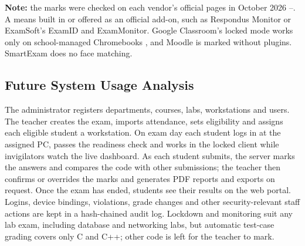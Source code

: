 \noindent\textbf{Note:} the marks were checked on each vendor's official pages in October 2026 \cite{respondus1}--\cite{gclassroom_quiz}. A \cmark{} means built in or offered as an official add-on, such as Respondus Monitor \cite{respondus_webcam} or ExamSoft's ExamID and ExamMonitor. Google Classroom's locked mode works only on school-managed Chromebooks \cite{gclassroom_quiz}, and Moodle is marked without plugins. SmartExam does no face matching.

\subsection{Future System Usage Analysis}

The administrator registers departments, courses, labs, workstations and users. The teacher creates the exam, imports attendance, sets eligibility and assigns each eligible student a workstation. On exam day each student logs in at the assigned PC, passes the readiness check and works in the locked client while invigilators watch the live dashboard. As each student submits, the server marks the answers and compares the code with other submissions; the teacher then confirms or overrides the marks and generates PDF reports and exports on request. Once the exam has ended, students see their results on the web portal. Logins, device bindings, violations, grade changes and other security-relevant staff actions are kept in a hash-chained audit log. Lockdown and monitoring suit any lab exam, including database and networking labs, but automatic test-case grading covers only C and C++; other code is left for the teacher to mark.
